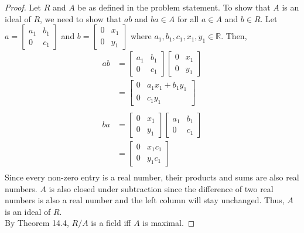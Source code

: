 \documentclass[12pt, letterpaper]{article}
\begin{document}
\begin{enumerate}
\begin{enumerate}[(a)]
        \begin{proof}
            Let $R$ and $A$ be as defined in the problem statement. To show that $A$ is an ideal of $R$,
            we need to show that $ab$ and $ba \in A$ for all $a \in A$ and $b \in R$. Let $a = \begin{bmatrix} a_1 & b_1 \\ 0 & c_1 \end{bmatrix}$ and $b = \begin{bmatrix} 0 & x_1 \\ 0 & y_1 \end{bmatrix}$ where $a_1, b_1, c_1, x_1, y_1 \in \mathbb{R}$. 
            Then,
            \begin{align*}
                ab &= \begin{bmatrix} a_1 & b_1 \\ 0 & c_1 \end{bmatrix} \begin{bmatrix} 0 & x_1 \\ 0 & y_1 \end{bmatrix} \\
                &= \begin{bmatrix} 0 & a_1x_1 + b_1y_1 \\ 0 & c_1y_1 \end{bmatrix} \\ \\
                ba &= \begin{bmatrix} 0 & x_1 \\ 0 & y_1 \end{bmatrix} \begin{bmatrix} a_1 & b_1 \\ 0 & c_1 \end{bmatrix} \\
                &= \begin{bmatrix} 0 & x_1c_1 \\ 0 & y_1c_1 \end{bmatrix} \\
                \end{align*}
                Since every non-zero entry is a real number, their products and sums are also real numbers. $A$ is also closed under subtraction
                since the difference of two real numbers is also a real number and the left column will stay unchanged. Thus, $A$ is an ideal of $R$. \\
                By Theorem 14.4, $R/A$ is a field iff $A$ is maximal.   
             

\end{proof}
\end{enumerate}
\end{enumerate}
\end{document}
